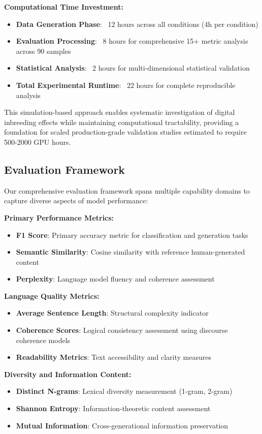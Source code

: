 \documentclass{article}
\begin{document}
\textbf{Computational Time Investment:}
\begin{itemize}
    \item \textbf{Data Generation Phase}: ~12 hours across all conditions (4h per condition)
    \item \textbf{Evaluation Processing}: ~8 hours for comprehensive 15+ metric analysis across 90 samples
    \item \textbf{Statistical Analysis}: ~2 hours for multi-dimensional statistical validation
    \item \textbf{Total Experimental Runtime}: ~22 hours for complete reproducible analysis
\end{itemize}

This simulation-based approach enables systematic investigation of digital inbreeding effects while maintaining computational tractability, providing a foundation for scaled production-grade validation studies estimated to require 500-2000 GPU hours.

\subsection{Evaluation Framework}

Our comprehensive evaluation framework spans multiple capability domains to capture diverse aspects of model performance:

\textbf{Primary Performance Metrics:}
\begin{itemize}
    \item \textbf{F1 Score}: Primary accuracy metric for classification and generation tasks
    \item \textbf{Semantic Similarity}: Cosine similarity with reference human-generated content
    \item \textbf{Perplexity}: Language model fluency and coherence assessment
\end{itemize}

\textbf{Language Quality Metrics:}
\begin{itemize}
    \item \textbf{Average Sentence Length}: Structural complexity indicator
    \item \textbf{Coherence Scores}: Logical consistency assessment using discourse coherence models
    \item \textbf{Readability Metrics}: Text accessibility and clarity measures
\end{itemize}

\textbf{Diversity and Information Content:}
\begin{itemize}
    \item \textbf{Distinct N-grams}: Lexical diversity measurement (1-gram, 2-gram)
    \item \textbf{Shannon Entropy}: Information-theoretic content assessment
    \item \textbf{Mutual Information}: Cross-generational information preservation
\end{itemize}
\end{document}
